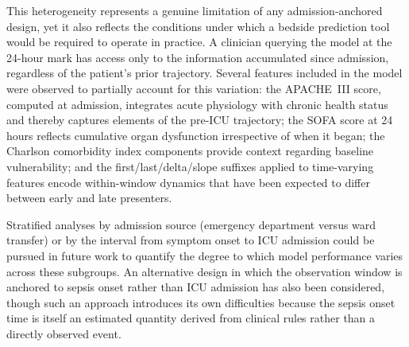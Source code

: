 This heterogeneity represents a genuine limitation of any admission-anchored design, yet it also reflects the conditions under which a bedside prediction tool would be required to operate in practice. A clinician querying the model at the 24-hour mark has access only to the information accumulated since admission, regardless of the patient's prior trajectory. Several features included in the model were observed to partially account for this variation: the APACHE~III score, computed at admission, integrates acute physiology with chronic health status and thereby captures elements of the pre-ICU trajectory; the SOFA score at 24 hours reflects cumulative organ dysfunction irrespective of when it began; the Charlson comorbidity index components provide context regarding baseline vulnerability; and the first/last/delta/slope suffixes applied to time-varying features encode within-window dynamics that have been expected to differ between early and late presenters.

Stratified analyses by admission source (emergency department versus ward transfer) or by the interval from symptom onset to ICU admission could be pursued in future work to quantify the degree to which model performance varies across these subgroups. An alternative design in which the observation window is anchored to sepsis onset rather than ICU admission has also been considered, though such an approach introduces its own difficulties because the sepsis onset time is itself an estimated quantity derived from clinical rules rather than a directly observed event.


